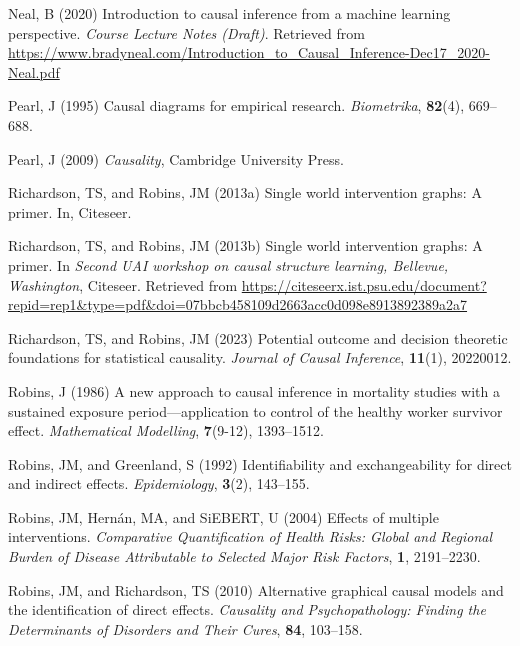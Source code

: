 \documentclass[
  single column]{article}
\newlength{\cslhangindent}
\newenvironment{CSLReferences}[2] %
 {\begin{list}{}{%
  \setlength{\itemindent}{0pt}
  \setlength{\leftmargin}{0pt}
  \setlength{\parsep}{0pt}
  \ifodd #1
   \setlength{\leftmargin}{\cslhangindent}
   \setlength{\itemindent}{-1\cslhangindent}
  \fi
  \setlength{\itemsep}{#2\baselineskip}}}
 {\end{list}}
\begin{document}
\begin{CSLReferences}{1}{0}
Neal, B (2020) Introduction to causal inference from a machine learning
perspective. \emph{Course Lecture Notes (Draft)}. Retrieved from
\url{https://www.bradyneal.com/Introduction_to_Causal_Inference-Dec17_2020-Neal.pdf}

Pearl, J (1995) Causal diagrams for empirical research.
\emph{Biometrika}, \textbf{82}(4), 669--688.

Pearl, J (2009) \emph{Causality}, Cambridge University Press.

Richardson, TS, and Robins, JM (2013a) Single world intervention graphs:
A primer. In, Citeseer.

Richardson, TS, and Robins, JM (2013b) Single world intervention graphs:
A primer. In \emph{Second UAI workshop on causal structure learning,
{B}ellevue, {W}ashington}, Citeseer. Retrieved from
\url{https://citeseerx.ist.psu.edu/document?repid=rep1&type=pdf&doi=07bbcb458109d2663acc0d098e8913892389a2a7}

Richardson, TS, and Robins, JM (2023) Potential outcome and decision
theoretic foundations for statistical causality. \emph{Journal of Causal
Inference}, \textbf{11}(1), 20220012.

Robins, J (1986) A new approach to causal inference in mortality studies
with a sustained exposure period---application to control of the healthy
worker survivor effect. \emph{Mathematical Modelling}, \textbf{7}(9-12),
1393--1512.

Robins, JM, and Greenland, S (1992) Identifiability and exchangeability
for direct and indirect effects. \emph{Epidemiology}, \textbf{3}(2),
143--155.

Robins, JM, Hernán, MA, and SiEBERT, U (2004) Effects of multiple
interventions. \emph{Comparative Quantification of Health Risks: Global
and Regional Burden of Disease Attributable to Selected Major Risk
Factors}, \textbf{1}, 2191--2230.

Robins, JM, and Richardson, TS (2010) Alternative graphical causal
models and the identification of direct effects. \emph{Causality and
Psychopathology: Finding the Determinants of Disorders and Their Cures},
\textbf{84}, 103--158.


\end{CSLReferences}
\end{document}
